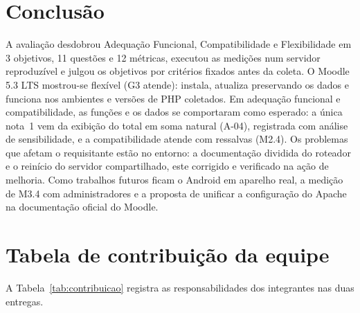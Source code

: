 \documentclass[12pt]{article}
\begin{document}
\section{Conclusão}
\label{sec:consideracoes}

A avaliação desdobrou Adequação Funcional, Compatibilidade e Flexibilidade em 3 objetivos, 11 questões e 12 métricas, executou as medições num servidor reproduzível e julgou os objetivos por critérios fixados antes da coleta. O Moodle 5.3 LTS mostrou-se flexível (G3 atende): instala, atualiza preservando os dados e funciona nos ambientes e versões de PHP coletados. Em adequação funcional e compatibilidade, as funções e os dados se comportaram como esperado: a única nota~1 vem da exibição do total em soma natural (A-04), registrada com análise de sensibilidade, e a compatibilidade atende com ressalvas (M2.4). Os problemas que afetam o requisitante estão no entorno: a documentação dividida do roteador e o reinício do servidor compartilhado, este corrigido e verificado na ação de melhoria. Como trabalhos futuros ficam o Android em aparelho real, a medição de M3.4 com administradores e a proposta de unificar a configuração do Apache na documentação oficial do Moodle.




\clearpage
\appendix

\section{Tabela de contribuição da equipe}
\label{ap:contribuicao}

A Tabela~\ref{tab:contribuicao} registra as responsabilidades dos integrantes nas duas entregas.
\end{document}
